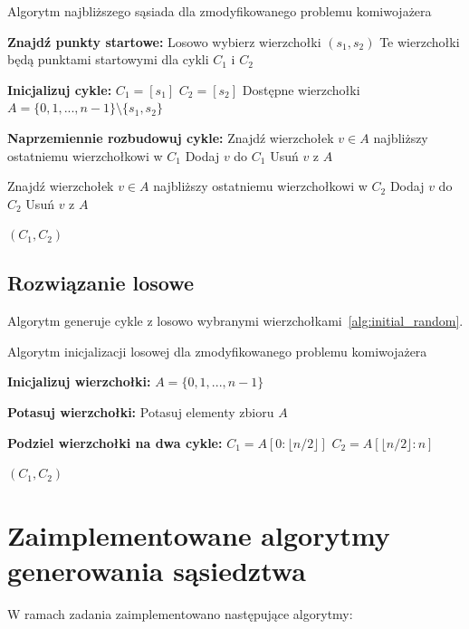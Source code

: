 \documentclass[12pt,a4paper]{article}
\begin{document}
\begin{algorithm}[H]
\caption{Algorytm najbliższego sąsiada dla zmodyfikowanego problemu komiwojażera}
\label{alg:initial_nearest_neighbor}
\begin{algorithmic}[1]
\State \textbf{Znajdź punkty startowe:}
\State Losowo wybierz wierzchołki $(s_1, s_2)$
\State Te wierzchołki będą punktami startowymi dla cykli $C_1$ i $C_2$

\State \textbf{Inicjalizuj cykle:}
\State $C_1 = [s_1]$
\State $C_2 = [s_2]$
\State Dostępne wierzchołki $A = \{0, 1, ..., n-1\} \setminus \{s_1, s_2\}$

\State \textbf{Naprzemiennie rozbudowuj cykle:}
        \State Znajdź wierzchołek $v \in A$ najbliższy ostatniemu wierzchołkowi w $C_1$
        \State Dodaj $v$ do $C_1$
        \State Usuń $v$ z $A$
        
            \State Znajdź wierzchołek $v \in A$ najbliższy ostatniemu wierzchołkowi w $C_2$
            \State Dodaj $v$ do $C_2$
            \State Usuń $v$ z $A$
        \EndIf
\EndWhile

\State \Return $(C_1, C_2)$
\end{algorithmic}
\end{algorithm}

\newpage
\subsection{Rozwiązanie losowe}
Algorytm generuje cykle z losowo wybranymi wierzchołkami~\ref{alg:initial_random}.

\begin{algorithm}[H]
\caption{Algorytm inicjalizacji losowej dla zmodyfikowanego problemu komiwojażera}
\label{alg:initial_random}
\begin{algorithmic}[1]
\State \textbf{Inicjalizuj wierzchołki:}
\State $A = \{0, 1, ..., n-1\}$

\State \textbf{Potasuj wierzchołki:}
\State Potasuj elementy zbioru $A$

\State \textbf{Podziel wierzchołki na dwa cykle:}
\State $C_1 = A[0 : \lfloor n / 2 \rfloor]$
\State $C_2 = A[\lfloor n / 2 \rfloor : n]$

\State \Return $(C_1, C_2)$
\end{algorithmic}
\end{algorithm}

\newpage

\section{Zaimplementowane algorytmy generowania sąsiedztwa}
W ramach zadania zaimplementowano następujące algorytmy:
\end{document}
